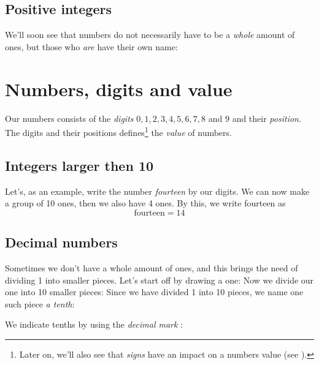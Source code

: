 \subsection*{Positive integers}
We'll soon see that numbers do not necessarily have to be a \textsl{whole} amount of ones, but those who \textsl{are} have their own name:\regv


\newpage
\section{Numbers, digits and value}
Our numbers consists of the \textit{digits} $ 0, 1, 2 , 3, 4, 5, 6, 7, 8 $ and $ 9 $ and their \textsl{position}. The digits and their positions defines\footnote{Later on, we'll also see that \textit{signs} have an impact on a numbers value  (see ).} the \textit{value}  of numbers.
\subsection*{Integers larger then 10}
Let's, as an example, write the number \textsl{fourteen} by our digits.
We can now make a group of 10 ones, then we also have 4 ones. By this, we write fourteen as
\[ \text{fourteen}=14 \]
\vsk

\newpage
\subsection*{Decimal numbers}
Sometimes we don't have a whole amount of ones, and this brings the need of dividing 1 into smaller pieces. Let's start off by drawing a one:
Now we divide our one into 10 smaller pieces:
Since we have divided 1 into 10 pieces, we name one such piece \textit{a tenth}:
\begin{comment}
\eks{\vs
	\fig{maal2}
	\fig{des2}
}\vsk
\end{comment}
We indicate tenths by using the \textit{decimal mark}   :
\regv
{}
\newpage
